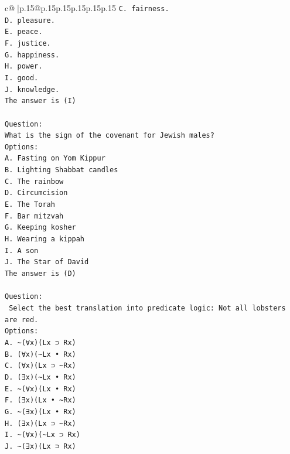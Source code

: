 \documentclass{article}
\begin{document}
{\begin{supertabular}{c@{$\;$}|p{.15\linewidth}@{}p{.15\linewidth}p{.15\linewidth}p{.15\linewidth}p{.15\linewidth}p{.15\linewidth}}
{{{\texttt{C. fairness.} \\
\texttt{D. pleasure.} \\
\texttt{E. peace.} \\
\texttt{F. justice.} \\
\texttt{G. happiness.} \\
\texttt{H. power.} \\
\texttt{I. good.} \\
\texttt{J. knowledge.} \\
\texttt{The answer is (I)} \\
\\ 
\texttt{Question:} \\
\texttt{What is the sign of the covenant for Jewish males?} \\
\texttt{Options:} \\
\texttt{A. Fasting on Yom Kippur} \\
\texttt{B. Lighting Shabbat candles} \\
\texttt{C. The rainbow} \\
\texttt{D. Circumcision} \\
\texttt{E. The Torah} \\
\texttt{F. Bar mitzvah} \\
\texttt{G. Keeping kosher} \\
\texttt{H. Wearing a kippah} \\
\texttt{I. A son} \\
\texttt{J. The Star of David} \\
\texttt{The answer is (D)} \\
\\ 
\texttt{Question:} \\
\texttt{ Select the best translation into predicate logic: Not all lobsters are red.} \\
\texttt{Options:} \\
\texttt{A. \textasciitilde{}(∀x)(Lx ⊃ Rx)} \\
\texttt{B. (∀x)(\textasciitilde{}Lx • Rx)} \\
\texttt{C. (∀x)(Lx ⊃ \textasciitilde{}Rx)} \\
\texttt{D. (∃x)(\textasciitilde{}Lx • Rx)} \\
\texttt{E. \textasciitilde{}(∀x)(Lx • Rx)} \\
\texttt{F. (∃x)(Lx • \textasciitilde{}Rx)} \\
\texttt{G. \textasciitilde{}(∃x)(Lx • Rx)} \\
\texttt{H. (∃x)(Lx ⊃ \textasciitilde{}Rx)} \\
\texttt{I. \textasciitilde{}(∀x)(\textasciitilde{}Lx ⊃ Rx)} \\
\texttt{J. \textasciitilde{}(∃x)(Lx ⊃ Rx)} \\
            }
        }
    }
     \\ \\


\end{supertabular}}
\end{document}
